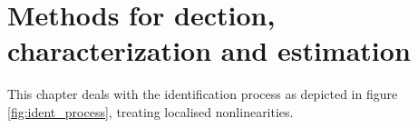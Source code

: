 
\chapter{Methods for dection, characterization and estimation}
\label{chap:methods_dec_char_est}

This chapter deals with the identification process as depicted in figure
\ref{fig:ident_process}, treating localised nonlinearities.




